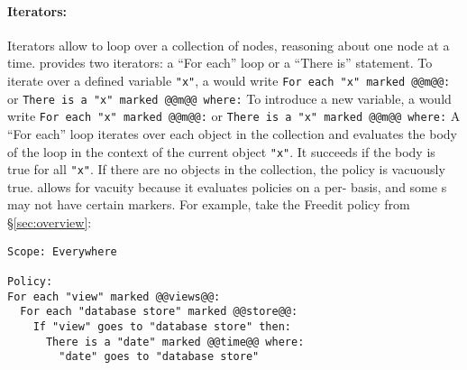 \paragraph{Iterators: }
Iterators allow \ces{} to loop over a collection of nodes, reasoning about one node at a time.
%
\syslang{} provides two iterators: a ``For each'' loop or a ``There is'' statement.
%
To iterate over a defined variable \lstinline[language=CNL]|"x"|, 
a \ce{} would write \lstinline[language=CNL]|For each "x" marked @@m@@:| or \lstinline[language=CNL]|There is a "x" marked @@m@@ where:|
%
To introduce a new variable,
a \ce{} would write \lstinline[language=CNL]|For each "x" marked @@m@@:| or \lstinline[language=CNL]|There is a "x" marked @@m@@ where:|
%
A ``For each'' loop iterates over each object in the collection and evaluates the body of the loop 
in the context of the current object \lstinline[language=CNL]|"x"|.
%
It succeeds if the body is true for all \lstinline[language=CNL]|"x"|.
%
If there are no objects in the collection, the policy is vacuously true.
%
\syslang{} allows for vacuity because it evaluates policies on a per-\controller{} basis,
and some \controller{}s may not have certain markers.
%
For example, take the Freedit policy from \S\ref{sec:overview}:
\begin{lstlisting}[language=CNL]
Scope: Everywhere

Policy:
For each "view" marked @@views@@:
  For each "database store" marked @@store@@:
    If "view" goes to "database store" then:
      There is a "date" marked @@time@@ where:
        "date" goes to "database store"
\end{lstlisting}

